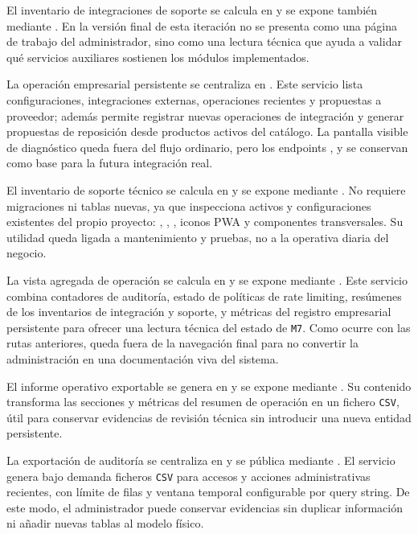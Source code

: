 El inventario de integraciones de soporte se calcula en  y se expone también mediante . En la versión final de esta iteración no se presenta como una página de trabajo del administrador, sino como una lectura técnica que ayuda a validar qué servicios auxiliares sostienen los módulos implementados.

La operación empresarial persistente se centraliza en . Este servicio lista configuraciones, integraciones externas, operaciones recientes y propuestas a proveedor; además permite registrar nuevas operaciones de integración y generar propuestas de reposición desde productos activos del catálogo. La pantalla visible de diagnóstico queda fuera del flujo ordinario, pero los endpoints ,  y  se conservan como base para la futura integración real.

El inventario de soporte técnico se calcula en  y se expone mediante . No requiere migraciones ni tablas nuevas, ya que inspecciona activos y configuraciones existentes del propio proyecto: , , , iconos PWA y componentes transversales. Su utilidad queda ligada a mantenimiento y pruebas, no a la operativa diaria del negocio.

La vista agregada de operación se calcula en  y se expone mediante . Este servicio combina contadores de auditoría, estado de políticas de rate limiting, resúmenes de los inventarios de integración y soporte, y métricas del registro empresarial persistente para ofrecer una lectura técnica del estado de \texttt{M7}. Como ocurre con las rutas anteriores, queda fuera de la navegación final para no convertir la administración en una documentación viva del sistema.

El informe operativo exportable se genera en  y se expone mediante . Su contenido transforma las secciones y métricas del resumen de operación en un fichero \texttt{CSV}, útil para conservar evidencias de revisión técnica sin introducir una nueva entidad persistente.

La exportación de auditoría se centraliza en  y se pública mediante . El servicio genera bajo demanda ficheros \texttt{CSV} para accesos y acciones administrativas recientes, con límite de filas y ventana temporal configurable por query string. De este modo, el administrador puede conservar evidencias sin duplicar información ni añadir nuevas tablas al modelo físico.

